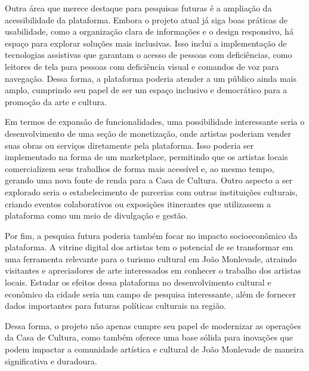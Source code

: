 Outra área que merece destaque para pesquisas futuras é a ampliação da acessibilidade da plataforma. Embora o projeto atual já siga boas práticas de usabilidade, como a organização clara de informações e o design responsivo, há espaço para explorar soluções mais inclusivas. Isso inclui a implementação de tecnologias assistivas que garantam o acesso de pessoas com deficiências, como leitores de tela para pessoas com deficiência visual e comandos de voz para navegação. Dessa forma, a plataforma poderia atender a um público ainda mais amplo, cumprindo seu papel de ser um espaço inclusivo e democrático para a promoção da arte e cultura.

Em termos de expansão de funcionalidades, uma possibilidade interessante seria o desenvolvimento de uma seção de monetização, onde artistas poderiam vender suas obras ou serviços diretamente pela plataforma. Isso poderia ser implementado na forma de um marketplace, permitindo que os artistas locais comercializem seus trabalhos de forma mais acessível e, ao mesmo tempo, gerando uma nova fonte de renda para a Casa de Cultura. Outro aspecto a ser explorado seria o estabelecimento de parcerias com outras instituições culturais, criando eventos colaborativos ou exposições itinerantes que utilizassem a plataforma como um meio de divulgação e gestão.

Por fim, a pesquisa futura poderia também focar no impacto socioeconômico da plataforma. A vitrine digital dos artistas tem o potencial de se transformar em uma ferramenta relevante para o turismo cultural em João Monlevade, atraindo visitantes e apreciadores de arte interessados em conhecer o trabalho dos artistas locais. Estudar os efeitos dessa plataforma no desenvolvimento cultural e econômico da cidade seria um campo de pesquisa interessante, além de fornecer dados importantes para futuras políticas culturais na região.

Dessa forma, o projeto não apenas cumpre seu papel de modernizar as operações da Casa de Cultura, como também oferece uma base sólida para inovações que podem impactar a comunidade artística e cultural de João Monlevade de maneira significativa e duradoura.
